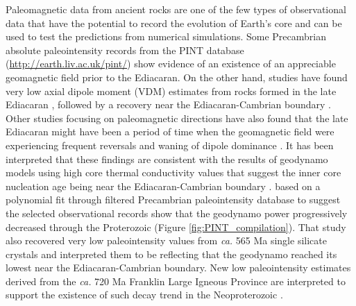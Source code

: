 \documentclass[draft]{agujournal2019}
\begin{document}
Paleomagnetic data from ancient rocks are one of the few types of observational data that have the potential to record the evolution of Earth’s core and can be used to test the predictions from numerical simulations. Some Precambrian absolute paleointensity records from the PINT database (\url{http://earth.liv.ac.uk/pint/}) show evidence of an existence of an appreciable geomagnetic field prior to the Ediacaran. On the other hand, studies have found very low axial dipole moment (VDM) estimates from rocks formed in the late Ediacaran \cite{Bono2019a, Shcherbakova2019a, Thallner2021b}, followed by a recovery near the Ediacaran-Cambrian boundary \cite{Thallner2021a}. Other studies focusing on paleomagnetic directions have also found that the late Ediacaran might have been a period of time when the geomagnetic field were experiencing frequent reversals and waning of dipole dominance \cite{Bono2015a, Kodama2020a}. It has been interpreted that these findings are consistent with the results of geodynamo models using high core thermal conductivity values that suggest the inner core nucleation age being near the Ediacaran-Cambrian boundary \cite{Driscoll2016a, Davies2021a}.  based on a polynomial fit through filtered Precambrian paleointensity database to suggest the selected observational records show that the geodynamo power progressively decreased through the Proterozoic (Figure \ref{fig:PINT_compilation}). That study also recovered very low paleointensity values from \textit{ca.} 565 Ma single silicate crystals and interpreted them to be reflecting that the geodynamo reached its lowest near the Ediacaran-Cambrian boundary. New low paleointensity estimates derived from the \textit{ca.} 720 Ma Franklin Large Igneous Province are interpreted to support the existence of such decay trend in the Neoproterozoic \cite{Lloyd2021a}. 
\end{document}
